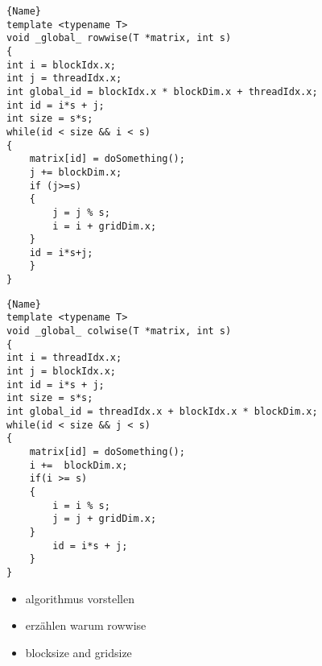 \noindent\begin{minipage}{.45\textwidth}
\begin{lstlisting}[caption=code 1,frame=tlrb]{Name}
template <typename T>
void _global_ rowwise(T *matrix, int s)
{
int i = blockIdx.x;
int j = threadIdx.x;
int global_id = blockIdx.x * blockDim.x + threadIdx.x;
int id = i*s + j;
int size = s*s;
while(id < size && i < s)
{
	matrix[id] = doSomething();
	j += blockDim.x;
	if (j>=s)
	{
		j = j % s;
		i = i + gridDim.x;
	}
	id = i*s+j;
	}
}
\end{lstlisting}
\end{minipage}\hfill
\begin{minipage}{.45\textwidth}
\begin{lstlisting}[caption=code 2,frame=tlrb]{Name}
template <typename T>
void _global_ colwise(T *matrix, int s)
{
int i = threadIdx.x;
int j = blockIdx.x;
int id = i*s + j;
int size = s*s;
int global_id = threadIdx.x + blockIdx.x * blockDim.x;
while(id < size && j < s)
{
	matrix[id] = doSomething();
	i +=  blockDim.x;
	if(i >= s)
	{
		i = i % s;
		j = j + gridDim.x;
	}
		id = i*s + j;
	}
}
\end{lstlisting}
\end{minipage}

\begin{itemize}
	\item algorithmus vorstellen
	\item erzählen warum rowwise
	\item blocksize and gridsize
\end{itemize}